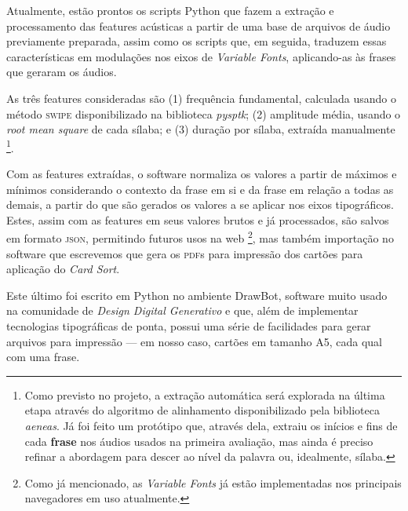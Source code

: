 \documentclass[a4paper,11pt,titlepage,singlespacing]{article}
\let\svthefootnote\thefootnote
\newcommand\Cfootnote[2][black]{\def\thefootnote{\color{#1}\svthefootnote}%
  \footnote{\color{#1}#2}}
\begin{document}
{    Atualmente, estão prontos os scripts Python que fazem a extração e processamento das features acústicas a partir de uma base de arquivos de áudio previamente preparada, assim como os scripts que, em seguida, traduzem essas características em modulações nos eixos de \textit{Variable Fonts}, aplicando-as às frases que geraram os áudios.
    
    As três features consideradas são (1) frequência fundamental, calculada usando o método \textsc{swipe} disponibilizado na biblioteca \textit{pysptk}; (2) amplitude média, usando o \textit{root mean square} de cada sílaba; e (3) duração por sílaba, extraída manualmente\Cfootnote[pos_parecer]{Como previsto no projeto, a extração automática será explorada na última etapa através do algoritmo de alinhamento disponibilizado pela biblioteca \textit{aeneas}. Já foi feito um protótipo que, através dela, extraiu os inícios e fins de cada \textbf{frase} nos áudios usados na primeira avaliação, mas ainda é preciso refinar a abordagem para descer ao nível da palavra ou, idealmente, sílaba.}.
    
    Com as features extraídas, o software normaliza os valores a partir de máximos e mínimos considerando o contexto da frase em si e da frase em relação a todas as demais, a partir do que são gerados os valores a se aplicar nos eixos tipográficos. Estes, assim com as features em seus valores brutos e já processados, são salvos em formato \textsc{json}, permitindo futuros usos na web\Cfootnote[pos_parecer]{Como já mencionado, as \textit{Variable Fonts} já estão implementadas nos principais navegadores em uso atualmente.}, mas também importação no software que escrevemos que gera os \textsc{pdf}s para impressão dos cartões para aplicação do \textit{Card Sort}.
    
    Este último foi escrito em Python no ambiente DrawBot, software muito usado na comunidade de \textit{Design Digital Generativo} e que, além de implementar tecnologias tipográficas de ponta, possui uma série de facilidades para gerar arquivos para impressão — em nosso caso, cartões em tamanho A5, cada qual com uma frase.
    
    
}
\end{document}
